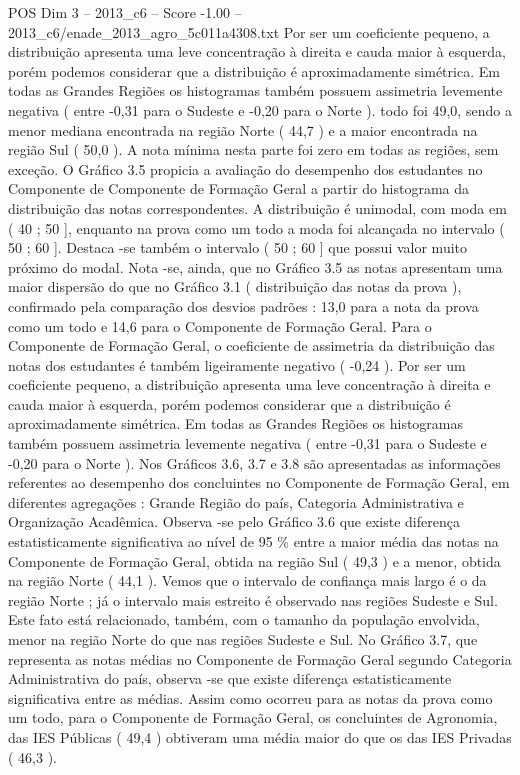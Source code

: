 \begin{textsample}{POS Dim 3 – 2013\_c6 – Score -1.00 – 2013\_c6/enade\_2013\_agro\_5c011a4308.txt}
Por ser um coeficiente pequeno, a distribuição apresenta uma leve concentração à direita e cauda maior à esquerda, porém podemos considerar que a distribuição é aproximadamente simétrica.
Em todas as Grandes Regiões os histogramas também possuem assimetria levemente negativa ( entre -0,31 para o Sudeste e -0,20 para o Norte ). todo foi 49,0, sendo a menor mediana encontrada na região Norte ( 44,7 ) e a maior encontrada na região Sul ( 50,0 ).
A nota mínima nesta parte foi zero em todas as regiões, sem exceção.
O Gráfico 3.5 propicia a avaliação do desempenho dos estudantes no Componente de Componente de Formação Geral a partir do histograma da distribuição das notas correspondentes.
A distribuição é unimodal, com moda em ( 40 ; 50 ], enquanto na prova como um todo a moda foi alcançada no intervalo ( 50 ; 60 ].
Destaca -se também o intervalo ( 50 ; 60 ] que possui valor muito próximo do modal.
Nota -se, ainda, que no Gráfico 3.5 as notas apresentam uma maior dispersão do que no Gráfico 3.1 ( distribuição das notas da prova ), confirmado pela comparação dos desvios padrões : 13,0 para a nota da prova como um todo e 14,6 para o Componente de Formação Geral.
Para o Componente de Formação Geral, o coeficiente de assimetria da distribuição das notas dos estudantes é também ligeiramente negativo ( -0,24 ).
Por ser um coeficiente pequeno, a distribuição apresenta uma leve concentração à direita e cauda maior à esquerda, porém podemos considerar que a distribuição é aproximadamente simétrica.
Em todas as Grandes Regiões os histogramas também possuem assimetria levemente negativa ( entre -0,31 para o Sudeste e -0,20 para o Norte ).
Nos Gráficos 3.6, 3.7 e 3.8 são apresentadas as informações referentes ao desempenho dos concluintes no Componente de Formação Geral, em diferentes agregações : Grande Região do país, Categoria Administrativa e Organização Acadêmica.
Observa -se pelo Gráfico 3.6 que existe diferença estatisticamente significativa ao nível de 95 \% entre a maior média das notas na Componente de Formação Geral, obtida na região Sul ( 49,3 ) e a menor, obtida na região Norte ( 44,1 ).
Vemos que o intervalo de confiança mais largo é o da região Norte ; já o intervalo mais estreito é observado nas regiões Sudeste e Sul.
Este fato está relacionado, também, com o tamanho da população envolvida, menor na região Norte do que nas regiões Sudeste e Sul.
No Gráfico 3.7, que representa as notas médias no Componente de Formação Geral segundo Categoria Administrativa do país, observa -se que existe diferença estatisticamente significativa entre as médias.
Assim como ocorreu para as notas da prova como um todo, para o Componente de Formação Geral, os concluintes de Agronomia, das IES Públicas ( 49,4 ) obtiveram uma média maior do que os das IES Privadas ( 46,3 ).

\end{textsample}
